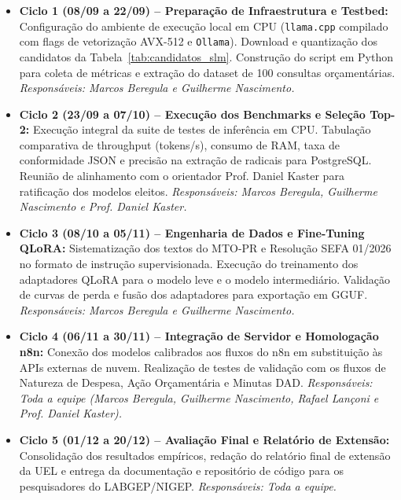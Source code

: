 \documentclass[11pt]{article}
\begin{document}
\begin{itemize}
    \item \textbf{Ciclo 1 (08/09 a 22/09) -- Preparação de Infraestrutura e Testbed:}
    Configuração do ambiente de execução local em CPU (\texttt{llama.cpp} compilado com flags de vetorização AVX-512 e \texttt{Ollama}). Download e quantização dos candidatos da Tabela~\ref{tab:candidatos_slm}. Construção do script em Python para coleta de métricas e extração do dataset de 100 consultas orçamentárias.
    \textit{Responsáveis: Marcos Beregula e Guilherme Nascimento.}

    \item \textbf{Ciclo 2 (23/09 a 07/10) -- Execução dos Benchmarks e Seleção Top-2:}
    Execução integral da suite de testes de inferência em CPU. Tabulação comparativa de throughput (tokens/s), consumo de RAM, taxa de conformidade JSON e precisão na extração de radicais para PostgreSQL. Reunião de alinhamento com o orientador Prof. Daniel Kaster para ratificação dos modelos eleitos.
    \textit{Responsáveis: Marcos Beregula, Guilherme Nascimento e Prof. Daniel Kaster.}

    \item \textbf{Ciclo 3 (08/10 a 05/11) -- Engenharia de Dados e Fine-Tuning QLoRA:}
    Sistematização dos textos do MTO-PR e Resolução SEFA 01/2026 no formato de instrução supervisionada. Execução do treinamento dos adaptadores QLoRA para o modelo leve e o modelo intermediário. Validação de curvas de perda e fusão dos adaptadores para exportação em GGUF.
    \textit{Responsáveis: Marcos Beregula e Guilherme Nascimento.}

    \item \textbf{Ciclo 4 (06/11 a 30/11) -- Integração de Servidor e Homologação n8n:}
    Conexão dos modelos calibrados aos fluxos do n8n em substituição às APIs externas de nuvem. Realização de testes de validação com os fluxos de Natureza de Despesa, Ação Orçamentária e Minutas DAD.
    \textit{Responsáveis: Toda a equipe (Marcos Beregula, Guilherme Nascimento, Rafael Lançoni e Prof. Daniel Kaster).}

    \item \textbf{Ciclo 5 (01/12 a 20/12) -- Avaliação Final e Relatório de Extensão:}
    Consolidação dos resultados empíricos, redação do relatório final de extensão da UEL e entrega da documentação e repositório de código para os pesquisadores do LABGEP/NIGEP.
    \textit{Responsáveis: Toda a equipe.}
\end{itemize}



\end{document}
